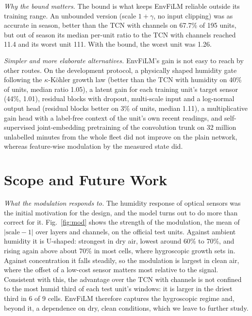 \documentclass[journal]{IEEEtran}
\begin{document}
\textit{Why the bound matters.} The bound is what keeps EnvFiLM reliable outside its training range. An unbounded version
(scale $1 + \gamma$, no input clipping) was as accurate in season, better than the TCN with channels on 67.7\% of 195
units, but out of season its median per-unit ratio to the TCN with channels reached 11.4 and its worst unit 111.
With the bound, the worst unit was 1.26.

\textit{Simpler and more elaborate alternatives.} EnvFiLM's gain is not easy to reach by other routes. On the
development protocol, a physically shaped humidity gate following the $\kappa$-K\"ohler growth law \cite{petters2007}
(better than the TCN with humidity on 40\% of units, median ratio 1.05), a latent gain for each training unit's target
sensor (44\%, 1.01), residual blocks with dropout, multi-scale input and a log-normal output head (residual blocks
better on 3\% of units, median 1.11), a multiplicative gain head with a label-free context of the unit's own recent
readings, and self-supervised joint-embedding pretraining of the convolution trunk on 32 million unlabelled minutes
from the whole fleet \cite{assran2023,bardes2022} did not improve on the plain network, whereas feature-wise modulation
by the measured state did.

\section{Scope and Future Work}
\label{sec:limits}

\textit{What the modulation responds to.} The humidity response of optical sensors was the initial motivation for the
design, and the model turns out to do more than correct for it. Fig.~\ref{fig:mod} shows the strength of the
modulation, the mean of $|\text{scale} - 1|$ over layers and channels, on the official test units. Against ambient
humidity it is U-shaped: strongest in dry air, lowest around 60\% to 70\%, and rising again above about 70\% in most
cells, where hygroscopic growth sets in. Against concentration it falls steadily, so the modulation is largest in clean
air, where the offset of a low-cost sensor matters most relative to the signal. Consistent with this, the advantage over
the TCN with channels is not confined to the most humid third of each test unit's windows: it is larger in the driest
third in 6 of 9 cells. EnvFiLM therefore captures the hygroscopic regime and, beyond it, a dependence on dry, clean
conditions, which we leave to further study.
\end{document}
